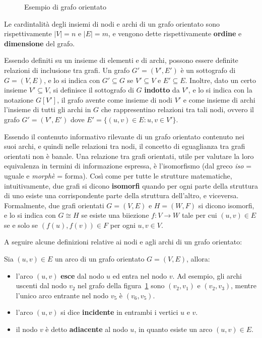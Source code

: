 \begin{figure}[h]
    \centering
    
    \vspace{-10pt}
    \caption{Esempio di grafo orientato}
    \label{fig:directed-graph-example}
\end{figure}

Le cardintalit\`a degli insiemi di nodi e archi di un grafo orientato sono rispettivamente $|V| = n$ e $|E| = m$,
e vengono dette rispettivamente \textbf{ordine} e \textbf{dimensione} del grafo.

Essendo definiti su un insieme di elementi e di archi, possono essere definite relazioni di inclusione tra grafi.
Un grafo $G' = (V', E')$ \`e un sottografo di $G = (V, E)$, e lo si indica con $G' \subseteq G$ se $V' \subseteq V$
e $E' \subseteq E$. \newline
Inoltre, dato un certo insieme $V' \subseteq V$, si definisce il sottografo di $G$ \textbf{indotto} da $V'$, e lo si
indica con la notazione $G[V']$, il grafo avente come insieme di nodi $V'$ e come insieme di archi l'insieme di tutti
gli archi in $G$ che rappresentino relazioni tra tali nodi, ovvero il grafo $G' = (V', E')$ dove
$E' = \{ (u, v) \in E : u, v \in V'\}$. \newline

Essendo il contenuto informativo rilevante di un grafo orientato contenuto nei suoi archi, e quindi nelle relazioni
tra nodi, il concetto di eguaglianza tra grafi orientati non \`e banale.
Una relazione tra grafi orientati, utile per valutare la loro equivalenza in termini di informazione espressa,
\`e l'isomorfismo (dal greco \textit{iso} = uguale e \textit{morph\`e} = forma).
Così come per tutte le strutture matematiche, intuitivamente, due grafi si dicono \textbf{isomorfi} quando per ogni
parte della struttura di uno esiste una corrispondente parte della struttura dell'altro, e viceversa.
Formalmente, due grafi orientati $G = (V, E)$ e $H = (W, F)$ si dicono isomorfi, e lo si indica con $G \cong H$ se
esiste una biiezione $f: V \rightarrow W$ tale per cui $(u, v) \in E$ se e solo se $(f(u), f(v)) \in F$ per ogni
$u, v \in V$. \newline

\label{par:archi-e-nodi-di-un-grafo-orientato}

A seguire alcune definizioni relative ai nodi e agli archi di un grafo orientato: \newline

Sia $(u, v) \in E$ un arco di un grafo orientato $G = (V, E)$, allora:
\begin{itemize}
    \item l'arco $(u, v)$ \textbf{esce} dal nodo $u$ ed {entra} nel nodo $v$.
        Ad esempio, gli archi uscenti dal nodo $v_2$ nel grafo della figura~\ref{fig:directed-graph-example}
        sono $(v_2, v_1)$ e $(v_2, v_3)$, mentre l'unico arco entrante nel nodo $v_5$ \`e $(v_6, v_5)$.
    \item l'arco $(u, v)$ si dice \textbf{incidente} in entrambi i vertici $u$ e $v$.
    \item il nodo $v$ \`e detto \textbf{adiacente} al nodo $u$, in quanto esiste un arco $(u, v) \in E$.
\end{itemize}

